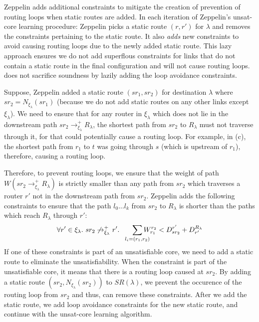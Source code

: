 Zeppelin adds additional constraints to mitigate the creation of prevention
of routing loops when static routes are added. In each iteration of
Zeppelin's unsat-core learning procedure: 
Zeppelin picks a static route $(r, r')$
for $\lambda$ and removes the constraints pertaining to 
the static route. It also \emph{adds} new constraints to avoid
causing routing loops due to the newly added static route. This
lazy approach ensures we do not add superflous constraints for links
that do not contain a static route in the final configuration 
and will not cause routing loops. \name does not sacrifice 
soundness by lazily adding the loop avoidance constraints. 

Suppose, Zeppelin added a static route $(sr_1, sr_2)$ for destination
$\lambda$ where $sr_2 = N_{\xi_\lambda}(sr_1)$ (because we do not add
static routes on any other links except $\xi_\lambda$). We need to
ensure that for any router in $\xi_\lambda$ which does not 
lie in the downstream path $sr_2 \rightarrow^+_{\xi_\lambda} R_\lambda$, 
the shortest path from $sr_2$ to $R_\lambda$ must not traverse through 
it, for that could potentially cause a routing loop. For example, in (c), the shortest path from $r_1$ to $t$ was
going through $s$ (which is upstream of $r_1$), therefore, causing 
a routing loop. 

Therefore, to prevent routing loops, we ensure that the weight
of path $W(sr_2 \rightarrow^+_{\xi_\lambda} R_\lambda)$ is 
strictly smaller than any path from $sr_2$ which traverses a
router $r'$ not in the downstream path from $sr_2$. Zeppelin
adds the following constraints to ensure that the path $l_0...l_k$
from $sr_2$ to $R_\lambda$ is shorter than the paths which reach 
$R_\lambda$ through $r'$: 
\begin{equation}
\forall r' \in \xi_\lambda. ~sr_2 \not\rightarrow_{\xi_\lambda}^+ r'. 
~~~~~\sum_{\mathclap{\substack{l_i=(r_1,r_2)}}} 
W_{r_1}^{r_2} < D^{r'}_{sr_2} + D_{r'}^{R_\lambda} 
\end{equation}
If one of these constraints is part of an unsatisfiable
core, we need to add a static route to eliminate the 
unsatisfiability. When the constraint is part of the 
unsatisfiable core, it means that there is a routing 
loop caused at $sr_2$. By adding a static route 
$(sr_2, N_{\xi_\lambda}(sr_2))$ to $SR(\lambda)$, we prevent
the occurence of the routing loop from $sr_2$ and thus, can
remove these constraints. After we add the static route,
we add loop avoidance constraints for the new static
route, and continue with the unsat-core learning algorithm. 

